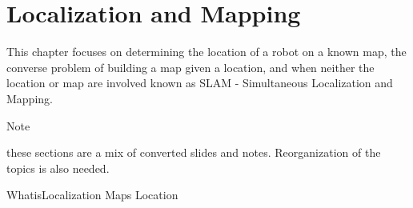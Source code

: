 \hypertarget{localization-and-mapping}{%
\section{Localization and Mapping}\label{localization-and-mapping}}

This chapter focuses on determining the location of a robot on a known
map, the converse problem of building a map given a location, and when
neither the location or map are involved known as SLAM - Simultaneous
Localization and Mapping.

Note

these sections are a mix of converted slides and notes. Reorganization
of the topics is also needed.

WhatisLocalization Maps Location
